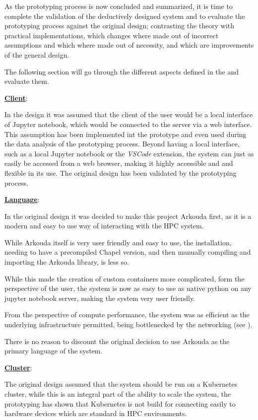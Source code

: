 As the prototyping process is now concluded and summarized,
it is time to complete the validation of the deductively designed system
and to evaluate the prototyping process against the original design;
contrasting the theory with practical implementations, which changes
where made out of incorrect assumptions and which where made out of necessity,
and which are improvements of the general design.

The following section will go through the different aspects defined in the
 and evaluate them.


\textbf{\hyperref[asp:client]{Client}}:

In the design it was assumed that the client of the user would
be a local interface of Jupyter notebook, which would be connected to the
server via a web interface.
This assumption has been implemented int the prototype and even used during the
data analysis of the prototyping process.
Beyond having a local interface, such as a local Jupyter notebook or the \textit{VSCode} extension,
the system can just as easily be accessed from a web browser,
making it highly accessible and and flexible in its use.
The original design has been validated by the prototyping process.

\textbf{\hyperref[asp:language]{Language}}:

In the original design it was decided to make this project Arkouda first,
as it is a modern and easy to use way of interacting with the \ac{HPC} system.

While Arkouda itself is very user friendly and easy to use, the installation,
needing to have a precompiled Chapel version, and then manually compiling
and importing the Arkouda library, is less so.

While this made the creation of custom containers more complicated,
form the perspective of the user, the system is now as easy to use as
native python on any jupyter notebook server, making the system very user friendly.

From the perspective of compute performance, the system was as efficient as
the underlying infrastructure permitted, being bottlenecked by the
networking (see ).

There is no reason to discount the original decision to use Arkouda as the
primary language of the system.


\textbf{\hyperref[asp:cluster]{Cluster}}:

The original design assumed that the system should be run on a Kubernetes cluster,
while this is an integral part of the ability to scale the system,
the prototyping has shown that Kubernetes is not build for connecting
easily to hardware devices which are standard in \ac{HPC} environments.

